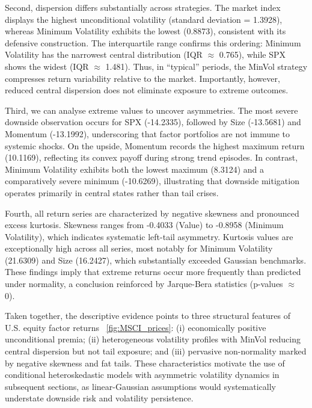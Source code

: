 \documentclass{article}
\begin{document}
Second, dispersion differs substantially across strategies. The market index displays the highest unconditional volatility (standard deviation = 1.3928), whereas Minimum Volatility exhibits the lowest (0.8873), consistent with its defensive construction. The interquartile range confirms this ordering: Minimum Volatility has the narrowest central distribution (IQR $\approx$ 0.765), while SPX shows the widest (IQR $\approx$ 1.481). Thus, in “typical” periods, the MinVol strategy compresses return variability relative to the market. Importantly, however, reduced central dispersion does not eliminate exposure to extreme outcomes.\newline

Third, we can analyse extreme values to uncover asymmetries. The most severe downside observation occurs for SPX (-14.2335), followed by Size (-13.5681) and Momentum (-13.1992), underscoring that factor portfolios are not immune to systemic shocks. On the upside, Momentum records the highest maximum return (10.1169), reflecting its convex payoff during strong trend episodes. In contrast, Minimum Volatility exhibits both the lowest maximum (8.3124) and a comparatively severe minimum (-10.6269), illustrating that downside mitigation operates primarily in central states rather than tail crises.\newline

Fourth, all return series are characterized by negative skewness and pronounced excess kurtosis. Skewness ranges from -0.4033 (Value) to -0.8958 (Minimum Volatility), which indicates systematic left-tail asymmetry. Kurtosis values are exceptionally high across all series, most notably for Minimum Volatility (21.6309) and Size (16.2427), which substantially exceeded Gaussian benchmarks. These findings imply that extreme returns occur more frequently than predicted under normality, a conclusion reinforced by Jarque-Bera statistics (p-values $\approx$ 0).\newline

Taken together, the descriptive evidence points to three structural features of U.S. equity factor returns ~\ref{fig:MSCI_prices}: (i) economically positive unconditional premia; (ii) heterogeneous volatility profiles with MinVol reducing central dispersion but not tail exposure; and (iii) pervasive non-normality marked by negative skewness and fat tails. These characteristics motivate the use of conditional heteroskedastic models with asymmetric volatility dynamics in subsequent sections, as linear-Gaussian assumptions would systematically understate downside risk and volatility persistence.\newline
\end{document}
